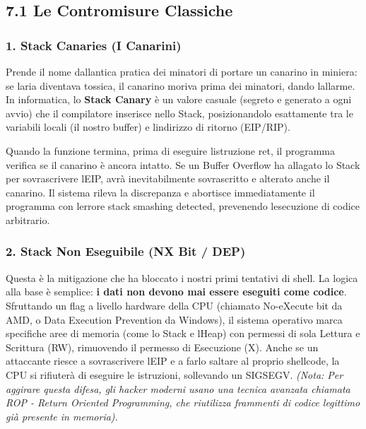 \documentclass[11pt,a4paper]{article}
\begin{document}
\subsection{7.1 Le Contromisure
Classiche}\label{le-contromisure-classiche}

\subsubsection{1. Stack Canaries (I
Canarini)}\label{stack-canaries-i-canarini}

Prende il nome dall\textquotesingle antica pratica dei minatori di
portare un canarino in miniera: se l\textquotesingle aria diventava
tossica, il canarino moriva prima dei minatori, dando
l\textquotesingle allarme. In informatica, lo \textbf{Stack Canary} è un
valore casuale (segreto e generato a ogni avvio) che il compilatore
inserisce nello Stack, posizionandolo esattamente tra le variabili
locali (il nostro buffer) e l\textquotesingle indirizzo di ritorno
(EIP/RIP).

Quando la funzione termina, prima di eseguire
l\textquotesingle istruzione ret, il programma verifica se il canarino è
ancora intatto. Se un Buffer Overflow ha allagato lo Stack per
sovrascrivere l\textquotesingle EIP, avrà inevitabilmente sovrascritto e
alterato anche il canarino. Il sistema rileva la discrepanza e abortisce
immediatamente il programma con l\textquotesingle errore stack smashing
detected, prevenendo l\textquotesingle esecuzione di codice arbitrario.

\subsubsection{2. Stack Non Eseguibile (NX Bit /
DEP)}\label{stack-non-eseguibile-nx-bit-dep}

Questa è la mitigazione che ha bloccato i nostri primi tentativi di
shell. La logica alla base è semplice: \textbf{i dati non devono mai
essere eseguiti come codice}. Sfruttando un flag a livello hardware
della CPU (chiamato No-eXecute bit da AMD, o Data Execution Prevention
da Windows), il sistema operativo marca specifiche aree di memoria (come
lo Stack e l\textquotesingle Heap) con permessi di sola Lettura e
Scrittura (RW), rimuovendo il permesso di Esecuzione (X). Anche se un
attaccante riesce a sovrascrivere l\textquotesingle EIP e a farlo
saltare al proprio shellcode, la CPU si rifiuterà di eseguire le
istruzioni, sollevando un SIGSEGV. \emph{(Nota: Per aggirare questa
difesa, gli hacker moderni usano una tecnica avanzata chiamata ROP -
Return Oriented Programming, che riutilizza frammenti di codice
legittimo già presente in memoria).}
\end{document}
